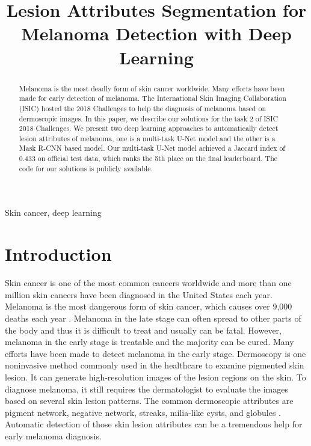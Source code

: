 \documentclass{article}
\title{Lesion Attributes Segmentation for Melanoma Detection with Deep Learning}
\begin{document}
%
\maketitle
%
\begin{abstract}
Melanoma is the most deadly form of skin cancer worldwide. Many efforts have been made for early detection of melanoma. The International Skin Imaging Collaboration (ISIC) hosted the 2018 Challenges to help the diagnosis of melanoma based on dermoscopic images. In this paper, we describe our solutions for the task 2 of ISIC 2018 Challenges. We present two deep learning approaches to automatically detect lesion attributes of melanoma, one is a multi-task U-Net model and the other is a Mask R-CNN based model. Our multi-task U-Net model achieved a Jaccard index of 0.433 on official test data, which ranks the 5th place on the final leaderboard. The code for our solutions is publicly available. 
\end{abstract}
%
\begin{keywords}
Skin cancer, deep learning
\end{keywords}
%
\section{Introduction}
\label{sec:intro}

Skin cancer is one of the most common cancers worldwide and more than one million skin cancers have been diagnosed in the United States each year. Melanoma is the most dangerous form of skin cancer, which causes over 9,000 deaths each year \cite{ucsw2013united}. Melanoma in the late stage can often spread to other parts of the body and thus it is difficult to treat and usually can be fatal. However, melanoma in the early stage is treatable and the majority can be cured. Many efforts have been made to detect melanoma in the early stage. Dermoscopy is one noninvasive method commonly used in the healthcare to examine pigmented skin lesion. It can generate high-resolution images of the lesion regions on the skin. To diagnose melanoma, it still requires the dermatologist to evaluate the images based on several skin lesion patterns. The common dermoscopic attributes are pigment network, negative network, streaks, milia-like cysts, and globules \citep{mishra2016overview}. Automatic detection of those skin lesion attributes can be a tremendous help for early melanoma diagnosis. 
\end{document}
